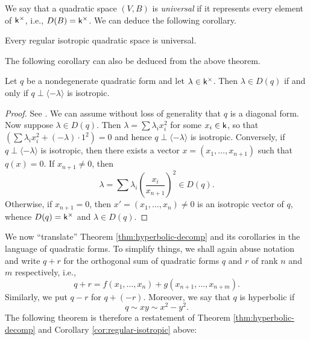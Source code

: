 \medskip


We say that a quadratic space \((V,B)\) is \emph{universal} if it represents
every element of \(\mathsf{k}^{\times}\), i.e., \(D(B) = \mathsf{k}^{\times}\).  We can deduce the
following corollary.

\begin{corollaryx}\label{cor:regular-isotropic} Every regular isotropic
    quadratic space is universal.
\end{corollaryx}

The following corollary can also be deduced from the above theorem.

\begin{corollaryx}\label{cor:rep-theorem-1} Let
    \(q\) be a nondegenerate quadratic form and let \(\lambda \in \mathsf{k}^{\times}\).
    Then \(\lambda \in D(q)\) if and only if \(q \perp \langle -\lambda
    \rangle\) is isotropic.
\end{corollaryx}

\begin{proof}
    See \cite[pp.~14--15]{lam1973quadratic}. We can assume without loss of
    generality that \(q\) is a diagonal form. Now suppose \(\lambda \in D(q)\).
    Then \(\lambda = \sum \lambda_i x_i^2\) for some \(x_i \in \mathsf{k}\), so that
    \(\left(\sum \lambda_ix_i^2 + (-\lambda) \cdot 1^2 \right) = 0\) and hence
    \(q \perp \langle -\lambda \rangle\) is isotropic. Conversely, if \(q \perp
    \langle -\lambda \rangle\) is isotropic, then there exists a vector \(x =
    (x_1, \dots, x_{n+1})\) such that \(q(x) = 0\). If \(x_{n+1} \neq 0\), then
    \[
        \lambda = \sum \lambda_i\left(\frac{x_i}{x_{n+1}}\right)^2 \in D(q).
    \]
    Otherwise, if \(x_{n+1} = 0\), then \(x' = (x_1, \dots, x_n) \neq 0\) is an
    isotropic vector of \(q\), whence \(D(q) = \mathsf{k}^{\times}\) and \(\lambda \in
    D(q)\).
\end{proof}

We now ``translate'' Theorem \ref{thm:hyperbolic-decomp} and its corollaries in
the language of quadratic forms. To simplify things, we shall again abuse
notation and write \(q + r\) for the orthogonal sum of quadratic forms \(q\) and
\(r\) of rank \(n\) and \(m\) respectively, i.e.,
\[q + r = f(x_1, \dots, x_n) + g(x_{n+1}, \dots, x_{n+m}).\] Similarly, we put
\(q - r\) for \(q + (-r)\). Moreover, we say that \(q\) is hyperbolic if
\[
    q \sim xy \sim x^2 - y^2.
\]
The following theorem is therefore a restatement of Theorem
\ref{thm:hyperbolic-decomp} and Corollary \ref{cor:regular-isotropic} above:

